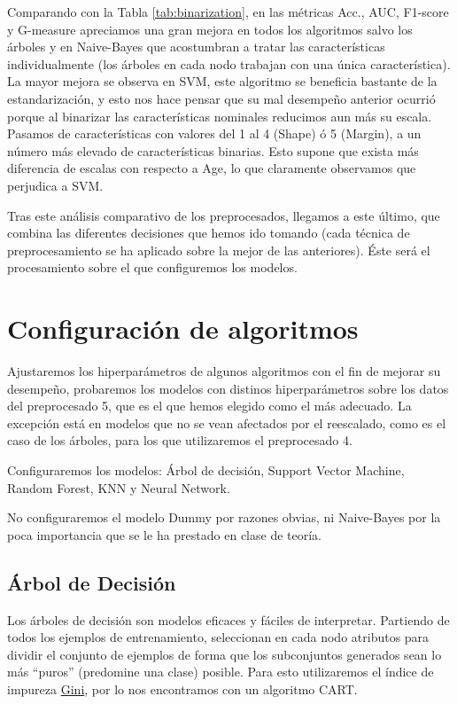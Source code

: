 \documentclass{article}
\begin{document}
Comparando con la Tabla \ref{tab:binarization}, en las métricas Acc.,
AUC, F1-score y G-measure apreciamos una gran mejora en todos los
algoritmos salvo los árboles y en Naive-Bayes que acostumbran a tratar
las características individualmente (los árboles en cada nodo trabajan
con una única característica). La mayor mejora se observa en SVM, este
algoritmo se beneficia bastante de la estandarización, y esto nos hace
pensar que su mal desempeño anterior ocurrió porque al binarizar las
características nominales reducimos aun más su escala. Pasamos de
características con valores del 1 al 4 (Shape) ó 5 (Margin), a un
número más elevado de características binarias. Esto supone que exista
más diferencia de escalas con respecto a Age, lo que claramente
observamos que perjudica a SVM.

Tras este análisis comparativo de los preprocesados, llegamos a este
último, que combina las diferentes decisiones que hemos ido tomando
(cada técnica de preprocesamiento se ha aplicado sobre la mejor de las
anteriores). Éste será el procesamiento sobre el que configuremos los
modelos.

\section{Configuración de algoritmos} \label{sec:configuracion}

Ajustaremos los hiperparámetros de algunos algoritmos con el fin de
mejorar su desempeño, probaremos los modelos con distinos
hiperparámetros sobre los datos del preprocesado 5, que es el que
hemos elegido como el más adecuado. La excepción está en modelos que
no se vean afectados por el reescalado, como es el caso de los
árboles, para los que utilizaremos el preprocesado 4.

Configuraremos los modelos: Árbol de decisión, Support Vector Machine,
Random Forest, KNN y Neural Network.

No configuraremos el modelo Dummy por razones obvias, ni Naive-Bayes
por la poca importancia que se le ha prestado en clase de teoría.

\subsection{Árbol de Decisión}

Los árboles de decisión son modelos eficaces y fáciles de
interpretar. Partiendo de todos los ejemplos de entrenamiento,
seleccionan en cada nodo atributos para dividir el conjunto de
ejemplos de forma que los subconjuntos generados sean lo más ``puros''
(predomine una clase) posible. Para esto utilizaremos el índice de
impureza
\href{https://es.wikipedia.org/wiki/Aprendizaje_basado_en_%C3%A1rboles_de_decisi%C3%B3n#Impureza_de_Gini}{Gini},
  por lo nos encontramos con un algoritmo CART.
\end{document}
